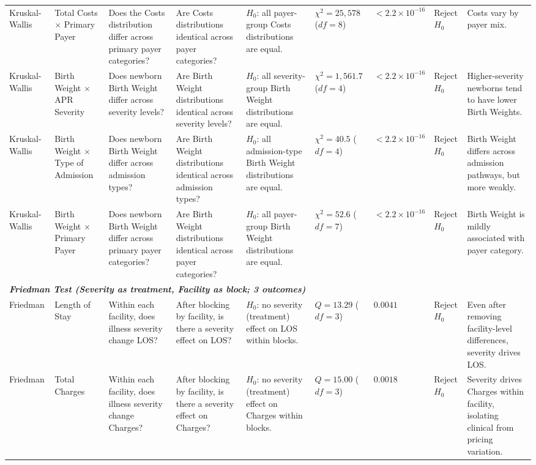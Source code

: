 \documentclass[12pt]{article}
\begin{document}
\begin{landscape}
\begin{scriptsize}
\begin{longtable}{p{2.0cm} p{2.4cm} p{3.0cm} p{2.7cm} p{2.5cm} p{1.7cm} p{1.3cm} p{1.3cm} p{3.0cm}}
Kruskal-Wallis & Total Costs $\times$ Primary Payer & Does the Costs distribution differ across primary payer categories? & Are Costs distributions identical across payer categories? & $H_0$: all payer-group Costs distributions are equal. & $\chi^2 = 25{,}578$ ($df=8$) & $< 2.2 \times 10^{-16}$ & Reject $H_0$ & Costs vary by payer mix. \\

Kruskal-Wallis & Birth Weight $\times$ APR Severity & Does newborn Birth Weight differ across severity levels? & Are Birth Weight distributions identical across severity levels? & $H_0$: all severity-group Birth Weight distributions are equal. & $\chi^2 = 1{,}561.7$ ($df=4$) & $< 2.2 \times 10^{-16}$ & Reject $H_0$ & Higher-severity newborns tend to have lower Birth Weights. \\

Kruskal-Wallis & Birth Weight $\times$ Type of Admission & Does newborn Birth Weight differ across admission types? & Are Birth Weight distributions identical across admission types? & $H_0$: all admission-type Birth Weight distributions are equal. & $\chi^2 = 40.5$ ($df=4$) & $< 2.2 \times 10^{-16}$ & Reject $H_0$ & Birth Weight differs across admission pathways, but more weakly. \\

Kruskal-Wallis & Birth Weight $\times$ Primary Payer & Does newborn Birth Weight differ across primary payer categories? & Are Birth Weight distributions identical across payer categories? & $H_0$: all payer-group Birth Weight distributions are equal. & $\chi^2 = 52.6$ ($df=7$) & $< 2.2 \times 10^{-16}$ & Reject $H_0$ & Birth Weight is mildly associated with payer category. \\

\midrule
\multicolumn{9}{l}{\textit{\textbf{Friedman Test (Severity as treatment, Facility as block; 3 outcomes)}}} \\

Friedman & Length of Stay & Within each facility, does illness severity change LOS? & After blocking by facility, is there a severity effect on LOS? & $H_0$: no severity (treatment) effect on LOS within blocks. & $Q = 13.29$ ($df=3$) & $0.0041$ & Reject $H_0$ & Even after removing facility-level differences, severity drives LOS. \\

Friedman & Total Charges & Within each facility, does illness severity change Charges? & After blocking by facility, is there a severity effect on Charges? & $H_0$: no severity (treatment) effect on Charges within blocks. & $Q = 15.00$ ($df=3$) & $0.0018$ & Reject $H_0$ & Severity drives Charges within facility, isolating clinical from pricing variation. \\


\end{longtable}
\end{scriptsize}
\end{landscape}
\end{document}
